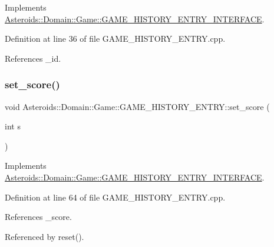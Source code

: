 Implements \hyperlink{classAsteroids_1_1Domain_1_1Game_1_1GAME__HISTORY__ENTRY__INTERFACE_ae87c07141095f1cb3699c378f37cc765}{Asteroids\+::\+Domain\+::\+Game\+::\+G\+A\+M\+E\+\_\+\+H\+I\+S\+T\+O\+R\+Y\+\_\+\+E\+N\+T\+R\+Y\+\_\+\+I\+N\+T\+E\+R\+F\+A\+CE}.



Definition at line 36 of file G\+A\+M\+E\+\_\+\+H\+I\+S\+T\+O\+R\+Y\+\_\+\+E\+N\+T\+R\+Y.\+cpp.



References \+\_\+id.

\mbox{\label{classAsteroids_1_1Domain_1_1Game_1_1GAME__HISTORY__ENTRY_a156c3017d2c591e7eaef0522a7e5249d}} 
\subsubsection{\texorpdfstring{set\+\_\+score()}{set\_score()}}
{\footnotesize\ttfamily void Asteroids\+::\+Domain\+::\+Game\+::\+G\+A\+M\+E\+\_\+\+H\+I\+S\+T\+O\+R\+Y\+\_\+\+E\+N\+T\+R\+Y\+::set\+\_\+score (\begin{DoxyParamCaption}\item[{int}]{s }\end{DoxyParamCaption})\hspace{0.3cm}{\ttfamily [virtual]}}



Implements \hyperlink{classAsteroids_1_1Domain_1_1Game_1_1GAME__HISTORY__ENTRY__INTERFACE_a23a1106062e67ef19d856f29ee8ade12}{Asteroids\+::\+Domain\+::\+Game\+::\+G\+A\+M\+E\+\_\+\+H\+I\+S\+T\+O\+R\+Y\+\_\+\+E\+N\+T\+R\+Y\+\_\+\+I\+N\+T\+E\+R\+F\+A\+CE}.



Definition at line 64 of file G\+A\+M\+E\+\_\+\+H\+I\+S\+T\+O\+R\+Y\+\_\+\+E\+N\+T\+R\+Y.\+cpp.



References \+\_\+score.



Referenced by reset().

